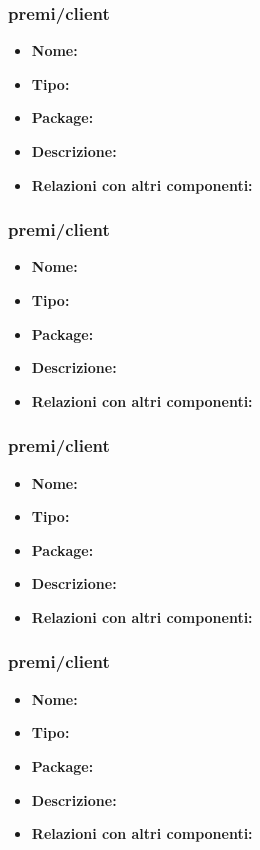 \subsubsection{premi/client}
\begin{itemize}
  \item[] \textbf{Nome:}
  \item[] \textbf{Tipo:}
  \item[] \textbf{Package:} 
  \item[] \textbf{Descrizione:} 
  \item[] \textbf{Relazioni con altri componenti:} 
\end{itemize}

\subsubsection{premi/client}
\begin{itemize}
  \item[] \textbf{Nome:}
  \item[] \textbf{Tipo:}
  \item[] \textbf{Package:} 
  \item[] \textbf{Descrizione:} 
  \item[] \textbf{Relazioni con altri componenti:} 
\end{itemize}

\subsubsection{premi/client}
\begin{itemize}
  \item[] \textbf{Nome:}
  \item[] \textbf{Tipo:}
  \item[] \textbf{Package:} 
  \item[] \textbf{Descrizione:} 
  \item[] \textbf{Relazioni con altri componenti:} 
\end{itemize}

\subsubsection{premi/client}
\begin{itemize}
  \item[] \textbf{Nome:}
  \item[] \textbf{Tipo:}
  \item[] \textbf{Package:} 
  \item[] \textbf{Descrizione:} 
  \item[] \textbf{Relazioni con altri componenti:} 
\end{itemize}


